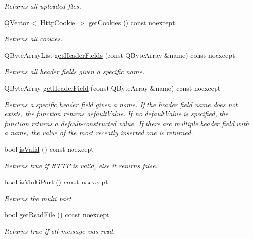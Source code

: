 \begin{DoxyCompactItemize}
\begin{DoxyCompactList}\small\item\em Returns all uploaded files. \end{DoxyCompactList}\item 
Q\+Vector$<$ \hyperlink{class_http_cookie}{Http\+Cookie} $>$ \hyperlink{class_http_parser_ac6ff3fd106a47dc7821723d451c8f9ad}{get\+Cookies} () const noexcept
\begin{DoxyCompactList}\small\item\em Returns all cookies. \end{DoxyCompactList}\item 
Q\+Byte\+Array\+List \hyperlink{class_http_parser_ab29e0fad07ccfa2ad565d1cc32da76cc}{get\+Header\+Fields} (const Q\+Byte\+Array \&name) const noexcept
\begin{DoxyCompactList}\small\item\em Returns all header fields given a specific name. \end{DoxyCompactList}\item 
Q\+Byte\+Array \hyperlink{class_http_parser_adabda41fe6457ab14b573a32085c2eea}{get\+Header\+Field} (const Q\+Byte\+Array \&name) const noexcept
\begin{DoxyCompactList}\small\item\em Returns a specific header field given a name. If the header field name does not exists, the function returns default\+Value. If no default\+Value is specified, the function returns a default-\/constructed value. If there are multiple header field with a name, the value of the most recently inserted one is returned. \end{DoxyCompactList}\item 
bool \hyperlink{class_http_parser_a6d5020425a4dff7b78acbf37a20cccba}{is\+Valid} () const noexcept
\begin{DoxyCompactList}\small\item\em Returns true if H\+T\+TP is valid, else it returns false. \end{DoxyCompactList}\item 
bool \hyperlink{class_http_parser_a83946a3296e540751e5715d974dc12b1}{is\+Multi\+Part} () const noexcept
\begin{DoxyCompactList}\small\item\em Returns the multi part. \end{DoxyCompactList}\item 
bool \hyperlink{class_http_parser_a3be6ae977af47186d80b67f26b4cbd69}{get\+Read\+File} () const noexcept
\begin{DoxyCompactList}\small\item\em Returns true if all message was read. \end{DoxyCompactList}\end{DoxyCompactItemize}
